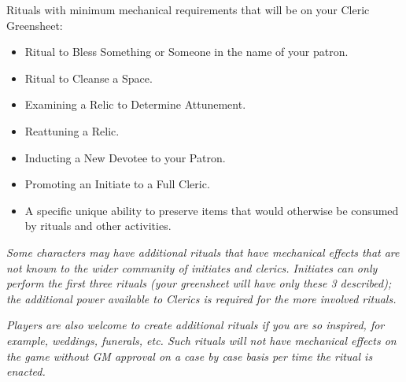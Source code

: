 \documentclass[blue]{GL2020}
\begin{document}
Rituals with minimum mechanical requirements that will be on your Cleric Greensheet:
\begin{itemize}
  \item Ritual to Bless Something or Someone in the name of your patron.
  \item Ritual to Cleanse a Space.
  \item Examining a Relic to Determine Attunement.
  \item Reattuning a Relic.
  \item Inducting a New Devotee to your Patron.
  \item Promoting an Initiate to a Full Cleric.
  \item A \pShippie{} specific unique ability to preserve items that would otherwise be consumed by rituals and other activities.
\end{itemize}

\emph{Some characters may have additional rituals that have mechanical effects that are not known to the wider community of initiates and clerics. Initiates can only perform the first three rituals (your greensheet will have only these 3 described); the additional power available to Clerics is required for the more involved rituals.}

\emph{Players are also welcome to create additional rituals if you are so inspired, for example, weddings, funerals, etc. Such rituals will not have mechanical effects on the game without GM approval on a case by case basis per time the ritual is enacted.}
\end{document}
